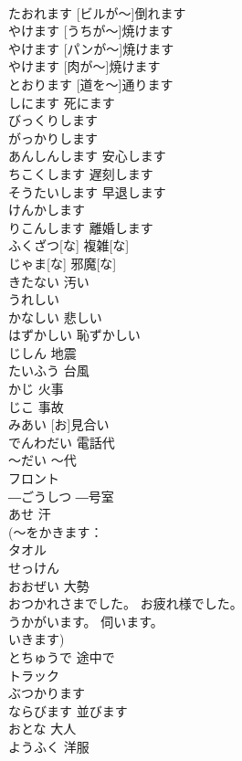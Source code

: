 \documentclass[8pt]{extreport}
\begin{document}
\begin{CJK}{UTF8}{min}
\\	[ビルが～]たおれます	[ビルが～]倒れます	
\\	[うちが～]やけます	[うちが～]焼けます	
\\	[パンが～]やけます	[パンが～]焼けます	
\\	[にくが～]やけます	[肉が～]焼けます	
\\	[みちを～]とおります	[道を～]通ります	
\\	しにます	死にます	
\\	びっくりします			
\\	がっかりします			
\\	あんしんします	安心します	
\\	ちこくします	遅刻します	
\\	そうたいします	早退します	
\\	けんかします			
\\	りこんします	離婚します	
\\	ふくざつ[な]	複雑[な]	
\\	じゃま[な]	邪魔[な]	
\\	きたない	汚い	
\\	うれしい			
\\	かなしい	悲しい	
\\	はずかしい	恥ずかしい	
\\	じしん	地震	
\\	たいふう	台風	
\\	かじ	火事	
\\	じこ	事故	
\\	[お]みあい	[お]見合い	
\\	でんわだい	電話代	
\\	～だい	～代	
\\	フロント			
\\	―ごうしつ	―号室	
\\	あせ	汗	
\\	(～をかきます：
\\	タオル			
\\	せっけん			
\\	おおぜい	大勢	
\\	おつかれさまでした。	お疲れ様でした。	
\\	うかがいます。	伺います。	
\\	いきます)		
\\	とちゅうで	途中で	
\\	トラック			
\\	ぶつかります			
\\	ならびます	並びます	
\\	おとな	大人	
\\	ようふく	洋服	

\end{CJK}
\end{document}

